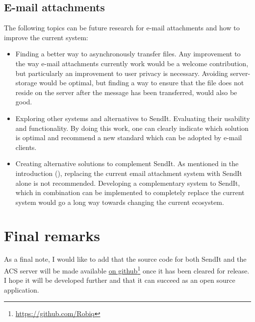 \subsection{E-mail attachments}
%
The following topics can be future research for e-mail attachments and how to improve the current system:
\begin{itemize}
	\item Finding a better way to asynchronously transfer files. Any improvement to the way e-mail attachments currently work would be a welcome contribution, but particularly an improvement to user privacy is necessary. Avoiding server-storage would be optimal, but finding a way to ensure that the file does not reside on the server after the message has been transferred, would also be good.
	\item Exploring other systems and alternatives to SendIt. Evaluating their usability and functionality. By doing this work, one can clearly indicate which solution is optimal and recommend a new standard which can be adopted by e-mail clients.
		\item Creating alternative solutions to complement SendIt. As mentioned in the introduction (), replacing the current email attachment system with SendIt alone is not recommended. Developing a complementary system to SendIt, which in combination can be implemented to completely replace the current system would go a long way towards changing the current ecosystem.
\end{itemize}
%
\section{Final remarks}
%
As a final note, I would like to add that the source code for both SendIt and the ACS server will be made available \href{https://github.com/Robiq}{on github}\footnote{\href{https://github.com/Robiq}{https://github.com/Robiq}} once it has been cleared for release. I hope it will be developed further and that it can succeed as an open source application.